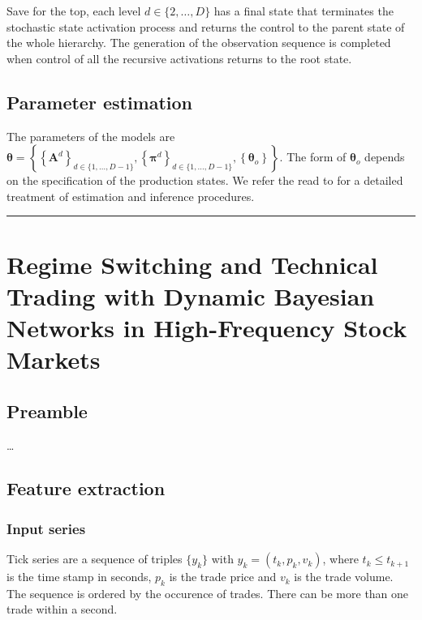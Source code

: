 \documentclass[]{article}
\newcommand{\mat}[1]{\bm{#1}}
\begin{document}
Save for the top, each level \(d \in \{2, \dots, D\}\) has a final state
that terminates the stochastic state activation process and returns the
control to the parent state of the whole hierarchy. The generation of
the observation sequence is completed when control of all the recursive
activations returns to the root state.

\subsection{Parameter estimation}\label{parameter-estimation}

The parameters of the models are
\(\mat{\theta} = \left\{ \left\{ \mat{A}^d \right\}_{d \in \{1, \dots, D - 1\}}, \left\{ \mat{\pi}^d \right\}_{d \in \{1, \dots, D - 1\}}, \left\{ \mat{\theta}_o \right\} \right\}\).
The form of \(\mat{\theta}_o\) depends on the specification of the
production states. We refer the read to \citet{fine1998hierarchical} for
a detailed treatment of estimation and inference procedures.

\begin{center}\rule{0.5\linewidth}{\linethickness}\end{center}

\section{Regime Switching and Technical Trading with Dynamic Bayesian
Networks in High-Frequency Stock
Markets}\label{regime-switching-and-technical-trading-with-dynamic-bayesian-networks-in-high-frequency-stock-markets}

\subsection{Preamble}\label{preamble}

\ldots{}

\subsection{Feature extraction}\label{feature-extraction}

\subsubsection{Input series}\label{input-series}

Tick series are a sequence of triples \(\{y_k\}\) with
\(y_k = (t_k, p_k, v_k)\), where \(t_k \le t_{k+1}\) is the time stamp
in seconds, \(p_k\) is the trade price and \(v_k\) is the trade volume.
The sequence is ordered by the occurence of trades. There can be more
than one trade within a second.
\end{document}
